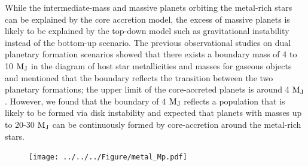 \documentclass[twocolumn, dvipdfmx]{aastex62}
\begin{document}
\begin{CJK*}{UTF8}{min}
While the intermediate-mass and massive planets orbiting the metal-rich stars can be explained by the core accretion model, the excess of massive planets is likely to be explained by the top-down model such as gravitational instability instead of the bottom-up scenario. The previous observational studies on dual planetary formation scenarios \citep{2007A&A...464..779R, 2017A&A...603A..30S, 2018ApJ...853...37S} showed that there exists a boundary mass of 4 to 10 $\rm M_J$ in the diagram of host star metallicities and masses for gaseous objects and mentioned that the boundary reflects the transition between the two planetary formations; the upper limit of the core-accreted planets is around 4 $\rm M_J$. However, we found that the boundary of 4 $\rm M_J$ reflects a population that is likely to be formed via disk instability and expected that planets with masses up to 20-30 $\rm M_J$ can be continuously formed by core-accretion around the metal-rich stars.

\begin{figure}[t]
\begin{center}
\texttt{[image: ../../../Figure/metal\_Mp.pdf]}
\caption{\label{fig:metal_Mp}}
\end{center}
\end{figure}


\acknowledgments


\vspace{5mm}


\begin{thebibliography}{}


\end{thebibliography}
\end{CJK*}
\end{document}
